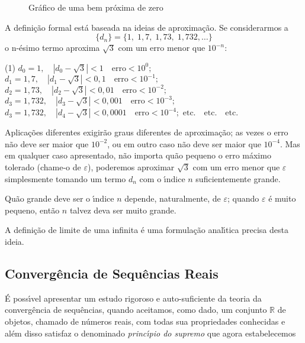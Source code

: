 \begin{figure}[H]
\begin{center}
  
  \end{center}
  \caption{Gr\'{a}fico de uma \seq bem pr\'{o}xima de zero}\label{seque-1}
\end{figure}

A defini\c{c}\~{a}o formal est\'{a} baseada na ideias de aproxima\c{c}\~{a}o. Se considerarmos a \seq
\begin{equation*}
    \{d_n\}=\{1,\; 1,7,\;1,73,\; 1,732,\ldots \}
\end{equation*}
o n-\'{e}simo termo aproxima $\sqrt{3}$ com um erro menor que $10^{-n}$:
\begin{tasks}[label=(\alph*),item-indent=6em,label-width=4ex,ref=(\alph*)](1)
\task \(d_{0}=1,  \quad |d_{0}-\sqrt{3}|<1 \quad \text{erro}<10^0;\)
\task  \(d_1=1,7,  \quad |d_1-\sqrt{3}|<0,1 \quad \text{erro}<10^{-1};\)
\task \(d_2=1,73, \quad  |d_2-\sqrt{3}|<0,01 \quad  \text{erro}<10^{-2};\)
\task \(d_3=1,732, \quad |d_3-\sqrt{3}|<0,001  \quad \text{erro}<10^{-3};\)
\task \(d_3=1,732, \quad |d_4-\sqrt{3}|<0,0001  \quad \text{erro}<10^{-4};\)
\task  \(\text{etc.} \quad \text{etc.} \quad \text{etc.}\) 
\end{tasks}

Aplica\c{c}\~{o}es diferentes exigir\~{a}o graus diferentes de aproxima\c{c}\~{a}o; as
vezes o erro n\~{a}o deve ser maior que $10^{-2}$, ou em outro caso n\~{a}o
deve ser maior que $10^{-4}$. Mas em qualquer caso apresentado, n\~{a}o
importa qu\~{a}o pequeno o erro m\'{a}ximo tolerado (chame-o de
$\varepsilon$), poderemos aproximar $\sqrt{3}$ com um erro menor que
$\varepsilon$ simplesmente tomando um termo $d_n$ com o \'{\i}ndice $n$
suficientemente grande.

Qu\~{a}o grande deve ser o \'{\i}ndice $n$ depende, naturalmente, de
$\varepsilon$; quando $\varepsilon$ \'{e} muito pequeno, ent\~{a}o $n$
talvez deva ser muito grande.

A defini\c{c}\~{a}o de limite de uma \seq infinita \'{e} uma formula\c{c}\~{a}o anal\'{\i}tica precisa desta ideia.

\subsection{Converg\^{e}ncia de Sequ\^{e}ncias Reais}
\'{E} poss\'{\i}vel apresentar um estudo rigoroso e auto-suficiente da
teoria da converg\^{e}ncia de sequ\^{e}ncias, quando aceitamos, como dado,
um conjunto $\mathbb{R}$ de objetos, chamado de n\'{u}meros reais, com
todas sua propriedades conhecidas e al\'{e}m disso satisfaz o
denominado \textit{princ\'{\i}pio do supremo} que agora estabelecemos

